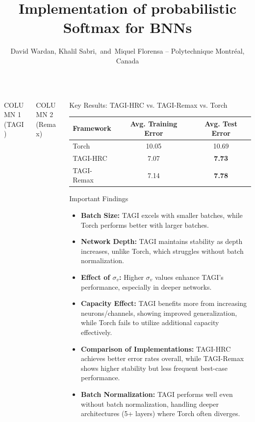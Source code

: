 \documentclass[final]{beamer}
\title{Implementation of probabilistic Softmax for BNNs}
\author{David Wardan, Khalil Sabri, \,and\, Miquel Florensa  -- Polytechnique Montr\'{e}al, Canada}
\institute[shortinst]{}
\begin{document}
\begin{frame}[t]

\begin{columns}
\begin{column}[T]{.31\textwidth}

{\Large COLUMN 1 (TAGI)}


\end{column}
\begin{column}[T]{.31\textwidth}

{\Large COLUMN 2 (Remax)}


\end{column}



\begin{column}[T]{.31\textwidth}

\begin{block}{Key Results: TAGI-HRC vs. TAGI-Remax vs. Torch}
\centering
\begin{tabular}{lcc}
\toprule
Framework & Avg. Training Error & Avg. Test Error \\
\midrule
Torch      & 10.05 & 10.69 \\
TAGI-HRC       & 7.07  & \textbf{7.73} \\
TAGI-Remax & 7.14  & \textbf{7.78} \\
\bottomrule
\end{tabular}
\end{block}

\begin{block}{Important Findings}
\begin{itemize}
    \item \textbf{Batch Size:} TAGI excels with smaller batches, while Torch performs better with larger batches.
    \item \textbf{Network Depth:} TAGI maintains stability as depth increases, unlike Torch, which struggles without batch normalization.
    \item \textbf{Effect of $\sigma_v$:} Higher $\sigma_v$ values enhance TAGI's performance, especially in deeper networks.
    \item \textbf{Capacity Effect:} TAGI benefits more from increasing neurons/channels, showing improved generalization, while Torch fails to utilize additional capacity effectively.
    \item \textbf{Comparison of Implementations:} TAGI-HRC achieves better error rates overall, while TAGI-Remax shows higher stability but less frequent best-case performance.
    \item \textbf{Batch Normalization:} TAGI performs well even without batch normalization, handling deeper architectures (5+ layers) where Torch often diverges.
\end{itemize}
\end{block}


\end{column}
\end{columns}
\end{frame}
\end{document}

